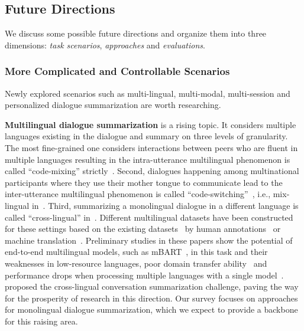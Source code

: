 \subsection{Future Directions}
\label{sec:future}


We discuss some possible future directions and organize them into
three dimensions: \textit{task scenarios}, \textit{approaches} and \textit{evaluations}. 


\subsubsection{More Complicated and Controllable Scenarios}

Newly explored scenarios such as multi-lingual, multi-modal, multi-session and personalized dialogue summarization are worth researching.

\textbf{Multilingual dialogue summarization} is a rising topic. It considers multiple languages existing in the dialogue and summary on three levels of granularity. The most fine-grained one considers interactions between peers who are fluent in multiple languages resulting in the intra-utterance multilingual phenomenon is called ``code-mixing'' strictly~\cite{mehnaz2021gupshup}. Second, dialogues happening among multinational participants where they use their mother tongue to communicate lead to the inter-utterance multilingual phenomenon is called ``code-switching''~\cite{mehnaz2021gupshup}, i.e., mix-lingual in~\cite{feng2022msamsum}. Third, summarizing a monolingual dialogue in a different language is called ``cross-lingual'' in~\citet{wang2022clidsum}. Different multilingual datasets have been constructed for these settings based on the existing datasets~\cite{gliwa2019samsum, chen2021dialsumm,zhu2021mediasum,zhong2021qmsum} by human annotations~\cite{wang2022clidsum,mehnaz2021gupshup,chen2022cross} or machine translation~\cite{feng2022msamsum}. Preliminary studies in these papers show the potential of end-to-end multilingual models, such as mBART~\cite{tang2021multilingual},  in this task and their weaknesses in low-resource languages, poor domain transfer ability~\cite{wang2022clidsum} and performance drops when processing multiple languages with a single model~\cite{feng2022msamsum}. \citet{chen2022cross,chen2023revisiting} proposed the cross-lingual conversation summarization challenge, paving the way for the prosperity of research in this direction. Our survey focuses on approaches for monolingual dialogue summarization, which we expect to provide a backbone for this raising area.



